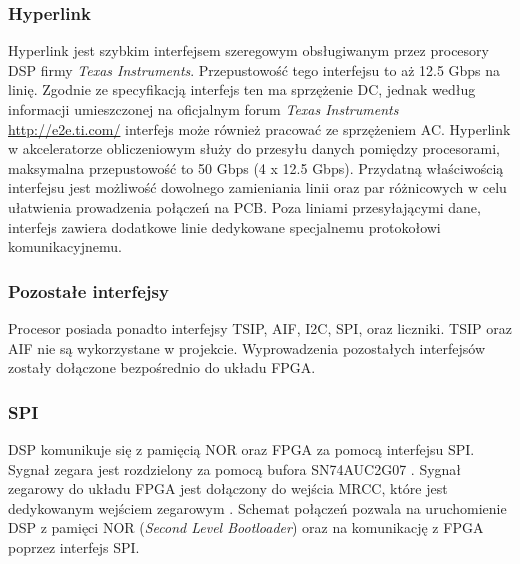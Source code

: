 \subsubsection{Hyperlink}
Hyperlink jest szybkim interfejsem szeregowym obsługiwanym przez procesory DSP firmy \textit{Texas Instruments}. Przepustowość tego interfejsu to aż 12.5 Gbps na linię. Zgodnie ze specyfikacją \cite{DSP:HDG} interfejs ten ma sprzężenie DC, jednak według informacji umieszczonej na oficjalnym forum \textit{Texas Instruments}  \url{http://e2e.ti.com/} \cite{HYPERLINK_AC} interfejs może również pracować ze sprzężeniem AC. Hyperlink w akceleratorze obliczeniowym służy do przesyłu danych pomiędzy procesorami, maksymalna przepustowość to 50 Gbps (4 x 12.5 Gbps). Przydatną właściwością interfejsu jest możliwość dowolnego zamieniania linii oraz par różnicowych w celu ułatwienia prowadzenia połączeń na PCB. 
Poza liniami przesyłającymi dane, interfejs zawiera dodatkowe linie dedykowane specjalnemu protokołowi komunikacyjnemu. 

\subsubsection{Pozostałe interfejsy}
Procesor posiada ponadto interfejsy TSIP, AIF, I2C, SPI, oraz liczniki. TSIP oraz AIF nie są wykorzystane w projekcie. Wyprowadzenia pozostałych interfejsów zostały dołączone bezpośrednio do układu FPGA.
\subsubsection{SPI}
DSP komunikuje się z pamięcią NOR oraz FPGA za pomocą interfejsu SPI. Sygnał zegara jest rozdzielony za pomocą bufora SN74AUC2G07 \cite{SN74AUC2G07}. Sygnał zegarowy do układu FPGA jest dołączony do wejścia MRCC, które jest dedykowanym wejściem zegarowym \cite{FPGA:UG472}. Schemat połączeń pozwala na uruchomienie DSP z pamięci NOR (\textit{Second Level Bootloader}) oraz na komunikację z FPGA poprzez interfejs SPI. 

